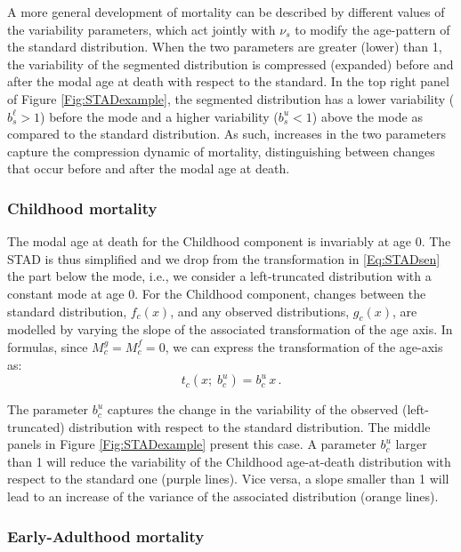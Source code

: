 \documentclass[Thesis]{subfiles}
\begin{document}
A more general development of mortality can be described by different values of the variability parameters, which act jointly with $\nu_{s}$ to modify the age-pattern of the standard distribution. When the two parameters are greater (lower) than 1, the variability of the segmented distribution is compressed (expanded) before and after the modal age at death with respect to the standard. In the top right panel of Figure \ref{Fig:STADexample}, the segmented distribution has a lower variability ($b_{s}^{\ell} > 1$) before the mode and a higher variability ($b_{s}^{u} < 1$) above the mode as compared to the standard distribution. As such, increases in the two parameters capture the compression dynamic of mortality, distinguishing between changes that occur before and after the modal age at death.

\subsubsection{Childhood mortality}

The modal age at death for the Childhood component is invariably at age 0. The STAD is thus simplified and we drop from the transformation in \eqref{Eq:STADsen} the part below the mode, i.e., we consider a left-truncated distribution with a constant mode at age 0. For the Childhood component, changes between the standard distribution, $f_{c}(x)$, and any observed distributions, $g_{c}(x)$, are modelled by varying the slope of the associated transformation of the age axis. In formulas, since $M_{c}^{g} = M_{c}^{f} = 0$, we can express the transformation of the age-axis as:
\begin{equation}\label{Eq:STADchil}
t_{c}(x;\;b_{c}^{u}) =  b_{c}^{u} \, x \,.
\end{equation}

The parameter $b_{c}^{u}$ captures the change in the variability of the observed (left-truncated) distribution with respect to the standard distribution. The middle panels in Figure \ref{Fig:STADexample} present this case. A parameter $b_{c}^{u}$ larger than 1 will reduce the variability of the Childhood age-at-death distribution with respect to the standard one (purple lines). Vice versa, a slope smaller than 1 will lead to an increase of the variance of the associated distribution (orange lines). 

\subsubsection{Early-Adulthood mortality}
\end{document}
